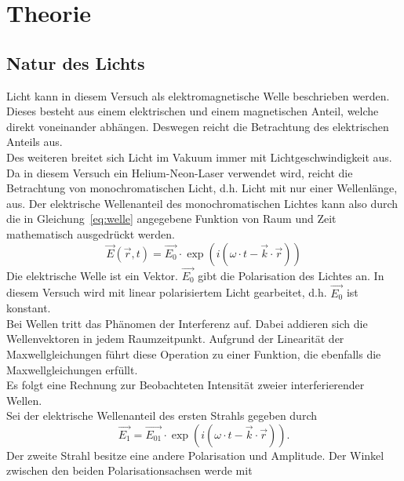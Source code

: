 
\section{Theorie}
\subsection{Natur des Lichts}
%
Licht kann in diesem Versuch als elektromagnetische Welle 
beschrieben werden.\\
Dieses besteht aus einem elektrischen und einem magnetischen Anteil, 
welche direkt voneinander abhängen. Deswegen reicht die Betrachtung 
des elektrischen Anteils aus.\\
Des weiteren breitet sich Licht im Vakuum immer mit 
Lichtgeschwindigkeit aus.\\
Da in diesem Versuch ein Helium-Neon-Laser verwendet wird, 
reicht die Betrachtung von monochromatischen Licht, d.h. Licht 
mit nur einer Wellenlänge, aus. Der elektrische Wellenanteil des 
monochromatischen Lichtes kann also durch die in 
Gleichung~\eqref{eq:welle} angegebene Funktion von 
Raum und Zeit mathematisch ausgedrückt werden.
%
\begin{equation}
\vec{E}(\vec{r},t) = \vec{E_0}\cdot \exp{(i(\omega\cdot t - 
\vec{k}\cdot \vec{r}))}
\label{eq:welle}
\end{equation}
%
Die elektrische Welle ist ein Vektor.
$\vec{E_0}$ gibt die Polarisation des Lichtes an. In diesem Versuch 
wird mit linear polarisiertem Licht gearbeitet, d.h. $\vec{E_0}$ ist 
konstant.\\
Bei Wellen tritt das Phänomen der Interferenz auf. Dabei 
addieren sich die Wellenvektoren in jedem Raumzeitpunkt.
Aufgrund der Linearität der Maxwellgleichungen führt diese Operation 
zu einer Funktion, die ebenfalls die Maxwellgleichungen erfüllt.\\
Es folgt eine Rechnung zur Beobachteten Intensität zweier 
interferierender Wellen.\\
Sei der elektrische Wellenanteil des ersten Strahls gegeben durch
\begin{equation}
\vec{E_1} = \vec{E_{01}}\cdot \exp{(i(\omega\cdot t - 
\vec{k}\cdot \vec{r}))}.
\end{equation}
Der zweite Strahl besitze eine andere Polarisation und Amplitude.
Der Winkel zwischen den beiden Polarisationsachsen werde mit 
